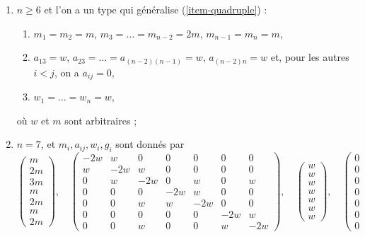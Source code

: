 \begin{lemma}[Genre un]
\begin{enumerate}
\begin{enumerate}
\end{enumerate}
où $w$ et $m$ sont arbitraires ;
\item
\label{item-double-triple}
$n \geq 6$ et l'on a un type qui généralise (\ref{item-quadruple}) :
\begin{enumerate}
\item $m_1 = m_2 = m$, $m_3 = \ldots = m_{n - 2} = 2m$, $m_{n - 1} = m_n = m$,
\item $a_{13} = w$, $a_{23} = \ldots = a_{(n - 2) (n - 1)} = w$,
$a_{(n - 2) n} = w$ et, pour les autres $i < j$, on a $a_{ij} = 0$,
\item $w_1 = \ldots = w_n = w$,
\end{enumerate}
où $w$ et $m$ sont arbitraires ;
\item
\label{item-E6-completed}
$n = 7$, et $m_i, a_{ij}, w_i, g_i$ sont donnés par
$$
\left(
\begin{matrix}
m \\
2m \\
3m \\
m \\
2m \\
m \\
2m
\end{matrix}
\right),
\quad
\left(
\begin{matrix}
-2w & w & 0 & 0 & 0 & 0 & 0 \\
w & -2w & w & 0 & 0 & 0 & 0 \\
0 & w & -2w & 0 & w & 0 & w \\
0 & 0 & 0 & -2w & w & 0 & 0 \\
0 & 0 & w & w & -2w & 0 & 0 \\
0 & 0 & 0 & 0 & 0 & -2w & w \\
0 & 0 & w & 0 & 0 & w & -2w
\end{matrix}
\right),
\quad
\left(
\begin{matrix}
w \\
w \\
w \\
w \\
w \\
w \\
w
\end{matrix}
\right),
\quad
\left(
\begin{matrix}
0 \\
0 \\
0 \\
0 \\
0 \\
0 \\
0
\end{matrix}
$$
\end{enumerate}
\end{lemma}
